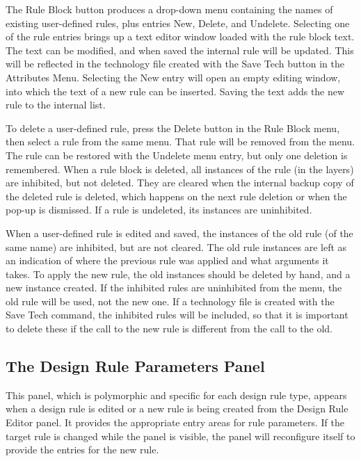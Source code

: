 The {\cb Rule Block} button produces a drop-down menu containing the
names of existing user-defined rules, plus entries {\cb New}, {\cb
Delete}, and {\cb Undelete}.  Selecting one of the rule entries brings
up a text editor window loaded with the rule block text.  The text can
be modified, and when saved the internal rule will be updated.  This
will be reflected in the technology file created with the {\cb Save
Tech} button in the {\cb Attributes Menu}.  Selecting the {\cb New}
entry will open an empty editing window, into which the text of a new
rule can be inserted.  Saving the text adds the new rule to the
internal list.

To delete a user-defined rule, press the {\cb Delete} button in the
{\cb Rule Block} menu, then select a rule from the same menu.  That
rule will be removed from the menu.  The rule can be restored with the
{\cb Undelete} menu entry, but only one deletion is remembered.  When
a rule block is deleted, all instances of the rule (in the layers) are
inhibited, but not deleted.  They are cleared when the internal backup
copy of the deleted rule is deleted, which happens on the next rule
deletion or when the pop-up is dismissed.  If a rule is undeleted, its
instances are uninhibited.

When a user-defined rule is edited and saved, the instances of the old
rule (of the same name) are inhibited, but are not cleared.  The old
rule instances are left as an indication of where the previous rule
was applied and what arguments it takes.  To apply the new rule, the
old instances should be deleted by hand, and a new instance created. 
If the inhibited rules are uninhibited from the menu, the old rule
will be used, not the new one.  If a technology file is created with
the {\cb Save Tech} command, the inhibited rules will be included, so
that it is important to delete these if the call to the new rule is
different from the call to the old.


\subsection{The {\cb Design Rule Parameters} Panel}

This panel, which is polymorphic and specific for each design rule
type, appears when a design rule is edited or a new rule is being
created from the {\cb Design Rule Editor} panel.  It provides the
appropriate entry areas for rule parameters.  If the target rule is
changed while the panel is visible, the panel will reconfigure itself
to provide the entries for the new rule.

